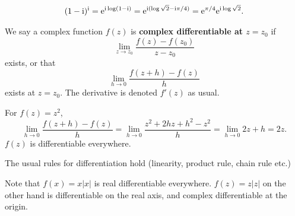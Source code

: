 \documentclass[letter-paper]{tufte-book}
\newenvironment{example}[1][Example]{\begin{trivlist}
\item[\hskip \labelsep {\bfseries #1}]}{\end{trivlist}}
\newcommand{\ex}{\mathrm{e}}
\newcommand{\zi}{{\rm i}}
\newcommand\Def[1]{\textbf{#1}}
\begin{document}
\begin{example}
  \begin{align*}
    (1 - \zi)^{\zi} = \ex^{\zi \log(1-\zi)} = \ex^{\zi (\log \sqrt{2} - \zi \pi/4)} = \ex^{\pi/4} \ex^{\zi \log\sqrt{2}}.
  \end{align*}
\end{example}

We say a complex function $f(z)$ is \Def{complex differentiable at $z = z_0$} if
\begin{equation*}
  \lim_{z\to z_0} \frac{f(z) - f(z_0)}{z - z_0}
\end{equation*}
exists, or that
\begin{equation*}
  \lim_{h\to 0} \frac{f(z + h) - f(z)}{h}
\end{equation*}
exists at $z = z_0$. The derivative is denoted $f'(z)$ as usual.

\begin{example}
  For $f(z) = z^2$,
  \begin{equation*}
    \lim_{h \to 0} \frac{f(z + h) - f(z)}{h} = \lim_{h \to 0} \frac{z^2 + 2hz + h^2 - z^2}{h} = \lim_{h \to 0} 2z + h = 2z.
  \end{equation*}
  $f(z)$ is differentiable everywhere.
\end{example}
The usual rules for differentiation hold (linearity, product rule, chain rule
etc.)

Note that $f(x) = x|x|$ is real differentiable everywhere. $f(z) = z|z|$ on the
other hand is differentiable on the real axis, and complex differentiable at the
origin.
\end{document}
